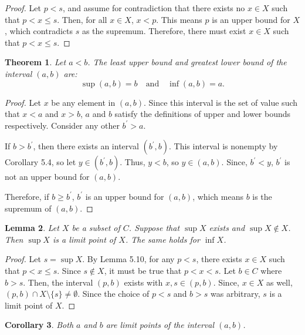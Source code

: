 \documentclass{amsart}
\newtheorem{theorem}{Theorem}
\newtheorem{lemma}[theorem]{Lemma}
\newtheorem{corollary}[theorem]{Corollary}
\newcommand{\1}{\mathds{1}}
\numberwithin{equation}{section}
\numberwithin{theorem}{section}
\begin{document}
\begin{proof}
	Let $p<s$, and assume for contradiction that there exists no $x\in X$ such that $p < x \le s$. Then, for all $x\in X$, $x<p$. This means $p$ is an upper bound for $X$, which contradicts $s$ as the supremum. Therefore, there must exist $x\in X$ such that $p < x \le s$. 
\end{proof}

\begin{theorem}  Let $a < b$.  The least upper bound and greatest lower bound of the interval $(a,b)$ are:
\[
\sup (a,b) = b \quad \text{and} \quad \inf (a,b) = a.
\]
\end{theorem}

\begin{proof}
	Let $x$ be any element in $(a,b)$. Since this interval is the set of value such that $x<a$ and $x>b$, $a$ and $b$ satisfy the definitions of upper and lower bounds respectively. Consider any other $b^\prime > a$. %
	
	If $b>b^\prime$, then there exists an interval $(b^\prime,b)$. This interval is nonempty by Corollary 5.4, so let $y\in (b^\prime,b)$. Thus, $y < b$, so $y\in (a,b)$. Since, $b^\prime < y$, $b^\prime$ is not an upper bound for $(a,b)$. 
	
	Therefore, if $b \ge b^\prime$, $b^\prime$ is an upper bound for $(a,b)$, which means $b$ is the supremum of $(a,b)$.
	
	
\end{proof}


\begin{lemma}  
Let $X$ be a subset of $C$.
Suppose that $\sup X$ exists and $\sup X \notin X$.  Then $\sup X$ is a limit point of $X$.  The same holds for $\inf X$.
\end{lemma} 

\begin{proof}
	Let $s = \sup X$. By Lemma 5.10, for any $p<s$, there exists $x\in X$ such that $p < x \le s$. Since $s\notin X$, it must be true that $p < x < s$. Let $b\in C$ where $b>s$. Then, the interval $(p,b)$ exists with $x,s\in (p,b)$. Since, $x\in X$ as well,  $(p,b) \cap X\setminus\{s\} \not= \emptyset$. Since the choice of $p<s$ and $b>s$ was arbitrary, $s$ is a limit point of $X$.
\end{proof}

\begin{corollary}  Both $a$ and $b$ are limit points of the interval $(a,b)$.
\end{corollary}
\end{document}
